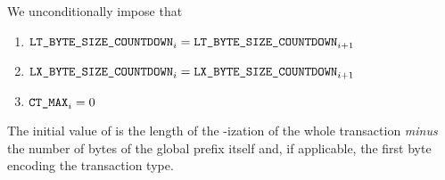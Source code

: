 \begin{center}
\end{center}

We unconditionally impose that
\begin{enumerate}
	\item $\texttt{LT\_BYTE\_SIZE\_COUNTDOWN} _{i} = \texttt{LT\_BYTE\_SIZE\_COUNTDOWN} _{i + 1}$
	\item $\texttt{LX\_BYTE\_SIZE\_COUNTDOWN} _{i} = \texttt{LX\_BYTE\_SIZE\_COUNTDOWN} _{i + 1}$
	\item $\texttt{CT\_MAX}    _{i} = 0$
\end{enumerate}
\saNote{}
The initial value of \ltByteSizeCountDown{}
is the length of the \rlp{}-ization of the whole transaction \emph{minus}
the number of bytes of the global \rlp{} prefix itself and,
if applicable, the first byte encoding the transaction type.

